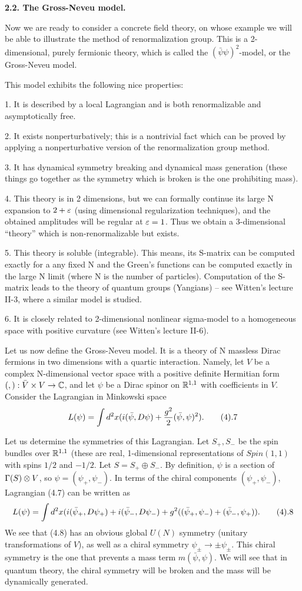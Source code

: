 {\bf 2.2. The Gross-Neveu model.} 

Now we are ready to consider a concrete field theory, on whose example 
we will be able to illustrate the method of renormalization group. 
This is a 2-dimensional, purely fermionic theory, which is called the 
$(\bar \psi\psi)^2$-model, or the Gross-Neveu model. 

This model exhibits the following nice properties:

1. It is described by a local Lagrangian and is both renormalizable and 
asymptotically free. 

2. It exists nonperturbatively; this is a nontrivial fact which can be proved 
by applying a nonperturbative version of the renormalization group method. 

3. It has dynamical symmetry breaking and dynamical mass generation 
(these things go together as the symmetry which is broken is the one 
prohibiting mass). 

4. This theory is in 2 dimensions, but we can formally continue its
large N expansion 
to $2+\varepsilon$ (using dimensional regularization techniques), and the obtained 
amplitudes will be regular at $\varepsilon=1$. Thus we obtain a 3-dimensional 
``theory'' 
which is non-renormalizable but exists.  

5. This theory is soluble (integrable). This means, its S-matrix can be 
computed exactly for a any fixed N and the Green's functions can be computed 
exactly in the large N limit (where N is the number 
of particles). Computation of the S-matrix leads to the theory of quantum 
groups (Yangians) -- see Witten's lecture II-3, where a similar model is 
studied. 

6. It is closely related to 2-dimensional nonlinear sigma-model 
to a homogeneous space with positive curvature (see Witten's lecture II-6). 
 
Let us now define the Gross-Neveu model. It is a theory of N massless 
Dirac fermions in two dimensions with a quartic interaction.
Namely, let $V$ be a complex N-dimensional vector space with a positive 
definite Hermitian form $(,):\bar V\times V\to \Bbb C$, 
and let $\psi$ be a Dirac spinor on $\Bbb R^{1,1}$ 
with coefficients in $V$. Consider the Lagrangian in Minkowski space
$$
L(\psi)=\int d^2x(i(\bar\psi,D\psi)+\frac{g^2}{2}(\bar\psi,\psi)^2).\tag 4.7
$$

Let us determine the symmetries of this Lagrangian.
Let $S_+,S_-$ be the spin bundles over $\Bbb R^{1,1}$ (these are real, 
1-dimensional representations of $Spin(1,1)$ with spins $1/2$ and $-1/2$.
Let $S=S_+\oplus S_-$. 
By definition, $\psi$ is a section of $\Gamma(S)\otimes V$, so 
$\psi=(\psi_+,\psi_-)$. In terms of the chiral components 
$(\psi_+,\psi_-)$, Lagrangian (4.7) can be written as 
$$
L(\psi)=\int d^2x(i(\bar\psi_+,D\psi_+)+i(\bar\psi_-,D\psi_-)+
g^2((\bar\psi_+,\psi_-)+(\bar\psi_-,\psi_+)).\tag 4.8
$$
We see that (4.8) has an obvious global $U(N)$ symmetry 
(unitary transformations of $V$), as well as a chiral symmetry 
$\psi_\pm\to \pm \psi_\pm$. This chiral symmetry is the one that prevents a 
mass term $m(\bar\psi,\psi)$. We will see that in quantum theory, 
the chiral symmetry will be broken and the mass will be dynamically generated. 

